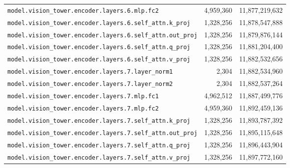 \documentclass[10pt,a4paper]{article}
\theoremstyle{definition}
\begin{document}
\begin{appendices}
\begin{longtable}{p{9.5cm}rr}
\texttt{model.\allowbreak{}vision\_tower.\allowbreak{}encoder.\allowbreak{}layers.\allowbreak{}6.\allowbreak{}mlp.\allowbreak{}fc2} & 4,959,360 & 11,877,219,632 \\
\texttt{model.\allowbreak{}vision\_tower.\allowbreak{}encoder.\allowbreak{}layers.\allowbreak{}6.\allowbreak{}self\_attn.\allowbreak{}k\_proj} & 1,328,256 & 11,878,547,888 \\
\texttt{model.\allowbreak{}vision\_tower.\allowbreak{}encoder.\allowbreak{}layers.\allowbreak{}6.\allowbreak{}self\_attn.\allowbreak{}out\_proj} & 1,328,256 & 11,879,876,144 \\
\texttt{model.\allowbreak{}vision\_tower.\allowbreak{}encoder.\allowbreak{}layers.\allowbreak{}6.\allowbreak{}self\_attn.\allowbreak{}q\_proj} & 1,328,256 & 11,881,204,400 \\
\texttt{model.\allowbreak{}vision\_tower.\allowbreak{}encoder.\allowbreak{}layers.\allowbreak{}6.\allowbreak{}self\_attn.\allowbreak{}v\_proj} & 1,328,256 & 11,882,532,656 \\
\texttt{model.\allowbreak{}vision\_tower.\allowbreak{}encoder.\allowbreak{}layers.\allowbreak{}7.\allowbreak{}layer\_norm1} & 2,304 & 11,882,534,960 \\
\texttt{model.\allowbreak{}vision\_tower.\allowbreak{}encoder.\allowbreak{}layers.\allowbreak{}7.\allowbreak{}layer\_norm2} & 2,304 & 11,882,537,264 \\
\texttt{model.\allowbreak{}vision\_tower.\allowbreak{}encoder.\allowbreak{}layers.\allowbreak{}7.\allowbreak{}mlp.\allowbreak{}fc1} & 4,962,512 & 11,887,499,776 \\
\texttt{model.\allowbreak{}vision\_tower.\allowbreak{}encoder.\allowbreak{}layers.\allowbreak{}7.\allowbreak{}mlp.\allowbreak{}fc2} & 4,959,360 & 11,892,459,136 \\
\texttt{model.\allowbreak{}vision\_tower.\allowbreak{}encoder.\allowbreak{}layers.\allowbreak{}7.\allowbreak{}self\_attn.\allowbreak{}k\_proj} & 1,328,256 & 11,893,787,392 \\
\texttt{model.\allowbreak{}vision\_tower.\allowbreak{}encoder.\allowbreak{}layers.\allowbreak{}7.\allowbreak{}self\_attn.\allowbreak{}out\_proj} & 1,328,256 & 11,895,115,648 \\
\texttt{model.\allowbreak{}vision\_tower.\allowbreak{}encoder.\allowbreak{}layers.\allowbreak{}7.\allowbreak{}self\_attn.\allowbreak{}q\_proj} & 1,328,256 & 11,896,443,904 \\
\texttt{model.\allowbreak{}vision\_tower.\allowbreak{}encoder.\allowbreak{}layers.\allowbreak{}7.\allowbreak{}self\_attn.\allowbreak{}v\_proj} & 1,328,256 & 11,897,772,160 \\

\end{longtable}
\end{appendices}
\end{document}
